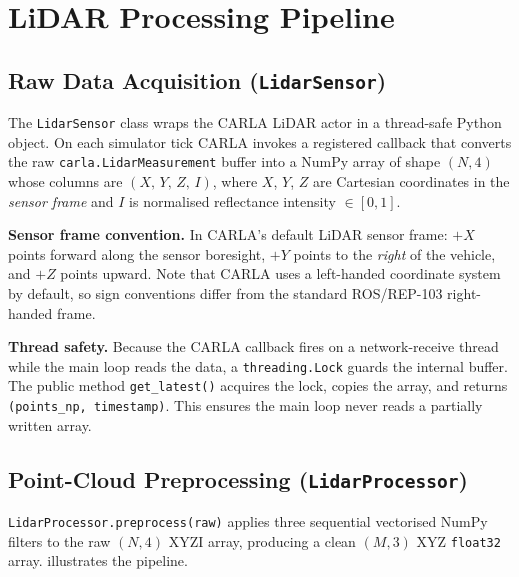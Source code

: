 \documentclass[12pt,a4paper]{article}
\begin{document}
\section{LiDAR Processing Pipeline}
\label{sec:lidar}

\subsection{Raw Data Acquisition (\texttt{LidarSensor})}
\label{subsec:lidar_acq}

The \texttt{LidarSensor} class wraps the CARLA LiDAR actor in a thread-safe
Python object.  On each simulator tick CARLA invokes a registered callback
that converts the raw \texttt{carla.LidarMeasurement} buffer into a
NumPy array of shape $(N,4)$ whose columns are $(X,\,Y,\,Z,\,I)$, where
$X$, $Y$, $Z$ are Cartesian coordinates in the \emph{sensor frame} and $I$ is
normalised reflectance intensity $\in [0,1]$.

\textbf{Sensor frame convention.}
In CARLA's default LiDAR sensor frame: $+X$ points forward along the sensor
boresight, $+Y$ points to the \emph{right} of the vehicle, and $+Z$ points
upward.  Note that CARLA uses a left-handed coordinate system by default, so
sign conventions differ from the standard ROS/REP-103 right-handed frame.

\textbf{Thread safety.}
Because the CARLA callback fires on a network-receive thread while the main
loop reads the data, a \texttt{threading.Lock} guards the internal buffer.
The public method \texttt{get\_latest()} acquires the lock, copies the array,
and returns \texttt{(points\_np, timestamp)}.  This ensures the main loop
never reads a partially written array.

\subsection{Point-Cloud Preprocessing (\texttt{LidarProcessor})}
\label{subsec:lidar_preproc}

\texttt{LidarProcessor.preprocess(raw)} applies three sequential vectorised
NumPy filters to the raw $(N,4)$ XYZI array, producing a clean $(M,3)$ XYZ
\texttt{float32} array.   illustrates the pipeline.
\end{document}
